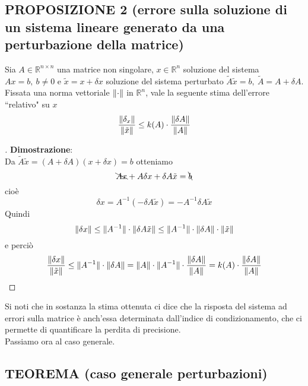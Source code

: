 \subsection{PROPOSIZIONE 2 (errore sulla soluzione di un sistema lineare generato da una perturbazione della matrice)}
Sia $A \in \mathbb{R}^{n \times n}$ una matrice non singolare, $x \in \mathbb{R}^n$ soluzione del sistema $Ax = b, \ b \neq 0$ e $\tilde{x} = x + \delta x$ soluzione del sistema perturbato $\tilde{A} \tilde{x} = b, \ \tilde{A} = A + \delta A$.\\
Fissata una norma vettoriale $\lVert\cdot\rVert$ in $\mathbb{R}^n$, vale la seguente stima dell'errore ``relativo" su $x$
\[
\frac{\lVert\delta_x\rVert}{\lVert\tilde{x}\rVert} \le k(A) \cdot \frac{\lVert\delta A\rVert}{\lVert A\rVert}
\]
\begin{proof}[\unskip\nopunct]
\textbf{Dimostrazione}:\\
Da $\tilde{A} \tilde{x} = (A + \delta A)(x + \delta x) = b$ otteniamo
\[
\bcancel{Ax} + A\delta x + \delta A \tilde{x} = \bcancel{b}
\]
cioè
\[
\delta x = A^{-1} (-\delta A \tilde{x}) = -A^{-1} \delta A\tilde{x}
\]
Quindi
\[
\lVert\delta x\rVert \le \lVert A^{-1}\rVert \cdot \lVert\delta A \tilde{x}\rVert \le \lVert A^{-1}\rVert \cdot \lVert\delta A\rVert \cdot \lVert\tilde{x}\rVert
\]
e perciò
\[
\frac{\lVert\delta x\rVert}{\lVert\tilde{x}\rVert} \le \lVert A^{-1}\rVert \cdot \lVert\delta A\rVert = \lVert A\rVert \cdot \lVert A^{-1}\rVert \cdot \frac{\lVert\delta A\rVert}{\lVert A\rVert} = k(A) \cdot \frac{\lVert\delta A\rVert}{\lVert A\rVert}
\]
\end{proof}
Si noti che in sostanza la stima ottenuta ci dice che la risposta del sistema ad errori sulla matrice è anch'essa determinata dall'indice di condizionamento, che ci permette di quantificare la perdita di precisione.\\
Passiamo ora al caso generale.\\

\subsection{TEOREMA (caso generale perturbazioni)}
\begin{center}
\end{center}
\newpage